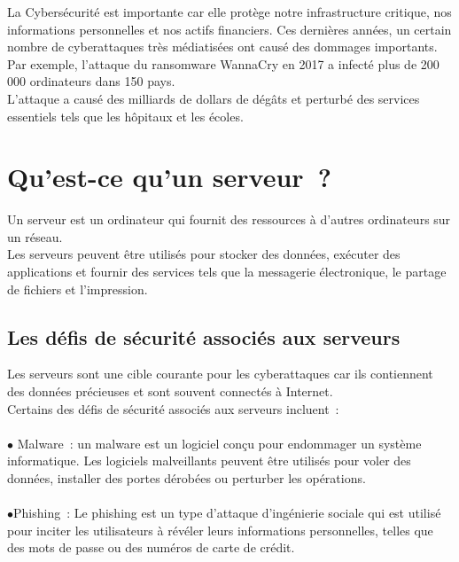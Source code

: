 La Cybersécurité est importante car elle protège notre infrastructure critique, nos informations personnelles et nos actifs financiers. Ces dernières années, un certain nombre de cyberattaques très médiatisées ont causé des dommages importants.\\
 Par exemple, l'attaque du ransomware WannaCry en 2017 a infecté plus de 200 000 ordinateurs dans 150 pays.\\ L'attaque a causé des milliards de dollars de dégâts et perturbé des services essentiels tels que les hôpitaux et les écoles.\\

  \paragraph{ }
 \section{ Qu'est-ce qu'un serveur ? }

Un serveur est un ordinateur qui fournit des ressources à d'autres ordinateurs sur un réseau. \\Les serveurs peuvent être utilisés pour stocker des données, exécuter des applications et fournir des services tels que la messagerie électronique, le partage de fichiers et l'impression.\\

\subsection{ Les défis de sécurité associés aux serveurs}

Les serveurs sont une cible courante pour les cyberattaques car ils contiennent des données précieuses et sont souvent connectés à Internet.\\ Certains des défis de sécurité associés aux serveurs incluent :

 \paragraph{ } $\bullet$ Malware : un malware est un logiciel conçu pour endommager un système informatique. Les logiciels malveillants peuvent être utilisés pour voler des données, installer des portes dérobées ou perturber les opérations.
  \paragraph{ } $\bullet$Phishing :  Le phishing est un type d'attaque d'ingénierie sociale qui est utilisé pour inciter les utilisateurs à révéler leurs informations personnelles, telles que des mots de passe ou des numéros de carte de crédit.
  
